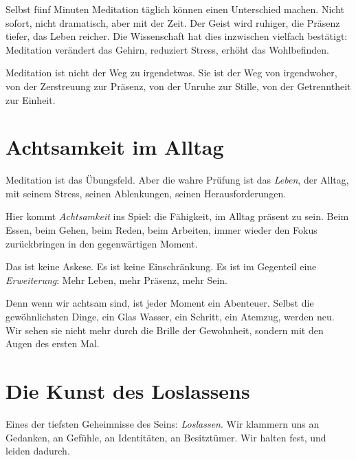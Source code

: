 \begin{bsp}
	Selbst fünf Minuten Meditation täglich können einen Unterschied machen. Nicht sofort, nicht dramatisch, aber mit der Zeit. Der Geist wird ruhiger, die Präsenz tiefer, das Leben reicher. Die Wissenschaft hat dies inzwischen vielfach bestätigt: Meditation verändert das Gehirn, reduziert Stress, erhöht das Wohlbefinden.
\end{bsp}

Meditation ist nicht der Weg zu irgendetwas. Sie ist der Weg von irgendwoher, von der Zerstreuung zur Präsenz, von der Unruhe zur Stille, von der Getrenntheit zur Einheit.

\section{Achtsamkeit im Alltag}

Meditation ist das Übungsfeld. Aber die wahre Prüfung ist das \emph{Leben}, der Alltag, mit seinem Stress, seinen Ablenkungen, seinen Herausforderungen.

Hier kommt \emph{Achtsamkeit} ins Spiel: die Fähigkeit, im Alltag präsent zu sein. Beim Essen, beim Gehen, beim Reden, beim Arbeiten, immer wieder den Fokus zurückbringen in den gegenwärtigen Moment.

Das ist keine Askese. Es ist keine Einschränkung. Es ist im Gegenteil eine \emph{Erweiterung}: Mehr Leben, mehr Präsenz, mehr Sein.

Denn wenn wir achtsam sind, ist jeder Moment ein Abenteuer. Selbst die gewöhnlichsten Dinge, ein Glas Wasser, ein Schritt, ein Atemzug, werden neu. Wir sehen sie nicht mehr durch die Brille der Gewohnheit, sondern mit den Augen des ersten Mal.

\section{Die Kunst des Loslassens}

Eines der tiefsten Geheimnisse des Seins: \emph{Loslassen}. Wir klammern uns an Gedanken, an Gefühle, an Identitäten, an Besitztümer. Wir halten fest, und leiden dadurch.

